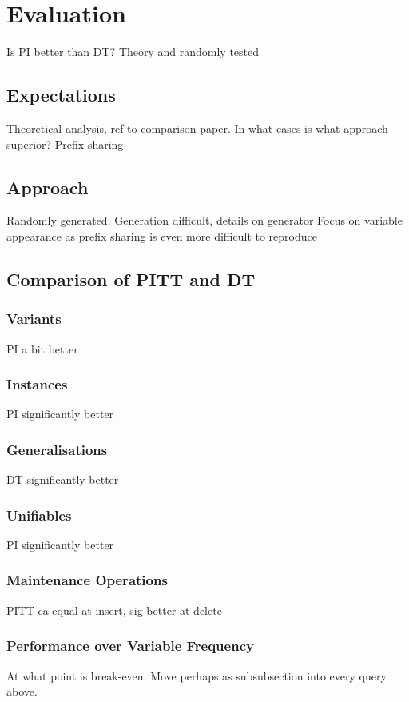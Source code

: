 \chapter{Evaluation}
Is PI better than DT? Theory and randomly tested

\section{Expectations}
Theoretical analysis, ref to comparison paper.
In what cases is what approach superior?
Prefix sharing

\section{Approach}
Randomly generated. Generation difficult, details on generator
Focus on variable appearance as prefix sharing is even more difficult to reproduce

\section{Comparison of PITT and DT}

\subsection{Variants}
PI a bit better

\subsection{Instances}
PI significantly better

\subsection{Generalisations}
DT significantly better

\subsection{Unifiables}
PI significantly better

\subsection{Maintenance Operations}
PITT ca equal at insert, sig better at delete

\subsection{Performance over Variable Frequency}
At what point is break-even.
Move perhaps as subsubsection into every query above.


